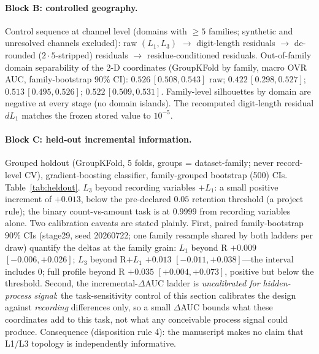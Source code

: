 \documentclass[12pt]{article}
\begin{document}
\paragraph{Block B: controlled geography.}
Control sequence at channel level (domains with $\ge 5$ families; synthetic
and unresolved channels excluded): raw $(L_1, L_3)$ $\to$ digit-length
residuals $\to$ de-rounded ($2\cdot5$-stripped) residuals $\to$
residue-conditioned residuals. Out-of-family domain separability of the 2-D
coordinates (GroupKFold by family, macro OVR AUC, family-bootstrap $90\%$
CI): $0.526\,[0.508, 0.543]$ raw; $0.422\,[0.298, 0.527]$;
$0.513\,[0.495, 0.526]$; $0.522\,[0.509, 0.531]$. Family-level silhouettes by
domain are negative at every stage (no domain islands). The recomputed
digit-length residual $dL_1$ matches the frozen stored value to $10^{-5}$.

\paragraph{Block C: held-out incremental information.}
Grouped holdout (GroupKFold, 5 folds, groups = dataset-family; never
record-level CV), gradient-boosting classifier, family-grouped bootstrap
(500) CIs. Table~\ref{tab:heldout}. $L_3$ beyond recording variables $+ L_1$: a small positive increment of
$+0.013$, below the pre-declared $0.05$ retention threshold (a project rule);
the binary count-vs-amount task is at $0.9999$ from recording variables
alone. Two calibration caveats are stated plainly. First, paired
family-bootstrap $90\%$ CIs (stage29, seed 20260722; one family resample
shared by both ladders per draw) quantify the deltas at the family grain:
$L_1$ beyond R $+0.009$ $[-0.006, +0.026]$; $L_3$ beyond R$+L_1$ $+0.013$
$[-0.011, +0.038]$---the interval includes $0$; full profile beyond R
$+0.035$ $[+0.004, +0.073]$, positive but below the threshold. Second, the incremental-$\Delta$AUC ladder
is \emph{uncalibrated for hidden-process signal}: the task-sensitivity
control of this section calibrates the design against \emph{recording}
differences only, so a small $\Delta$AUC bounds what these coordinates add
to this task, not what any conceivable process signal could produce.
Consequence (disposition rule 4): the manuscript makes no claim that L1/L3
topology is independently informative.
\end{document}
